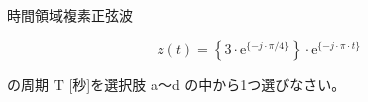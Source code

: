 時間領域複素正弦波

\[
z(t) =  \left \{ 3 \cdot \textrm{e}^{\{-j \cdot \pi/4 \}} \right \} \cdot \textrm{e}^{\{ -j \cdot \pi \cdot t \}}
\]

\bigskip
\noindent の周期 $\textrm{T}$ [秒]を選択肢 a〜d の中から1つ選びなさい。

